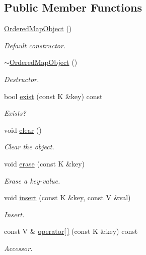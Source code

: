 \subsection*{Public Member Functions}
\begin{DoxyCompactItemize}
\item 
\mbox{\hyperlink{classADAT_1_1OrderedMapObject_ac9ea7852b3e405d4e0c6744626cb6f24}{Ordered\+Map\+Object}} ()
\begin{DoxyCompactList}\small\item\em Default constructor. \end{DoxyCompactList}\item 
\mbox{\hyperlink{classADAT_1_1OrderedMapObject_a255777a3e2ecc4482ad8d2adf630a8d2}{$\sim$\+Ordered\+Map\+Object}} ()
\begin{DoxyCompactList}\small\item\em Destructor. \end{DoxyCompactList}\item 
bool \mbox{\hyperlink{classADAT_1_1OrderedMapObject_a1300311ab06f03aba77a5911d0017caf}{exist}} (const K \&key) const
\begin{DoxyCompactList}\small\item\em Exists? \end{DoxyCompactList}\item 
void \mbox{\hyperlink{classADAT_1_1OrderedMapObject_a5bf5e1a45535f8277499ac9a149a2b26}{clear}} ()
\begin{DoxyCompactList}\small\item\em Clear the object. \end{DoxyCompactList}\item 
void \mbox{\hyperlink{classADAT_1_1OrderedMapObject_af5d9aad7f7a1ce462dfed9cbe13c638c}{erase}} (const K \&key)
\begin{DoxyCompactList}\small\item\em Erase a key-\/value. \end{DoxyCompactList}\item 
void \mbox{\hyperlink{classADAT_1_1OrderedMapObject_a6466cef0224cef7a1e943b32da6e3410}{insert}} (const K \&key, const V \&val)
\begin{DoxyCompactList}\small\item\em Insert. \end{DoxyCompactList}\item 
const V \& \mbox{\hyperlink{classADAT_1_1OrderedMapObject_ad6bf82315b8676a1e7a5733ad6d48e85}{operator\mbox{[}$\,$\mbox{]}}} (const K \&key) const
\begin{DoxyCompactList}\small\item\em Accessor. \end{DoxyCompactList}\item 

\end{DoxyCompactItemize}
